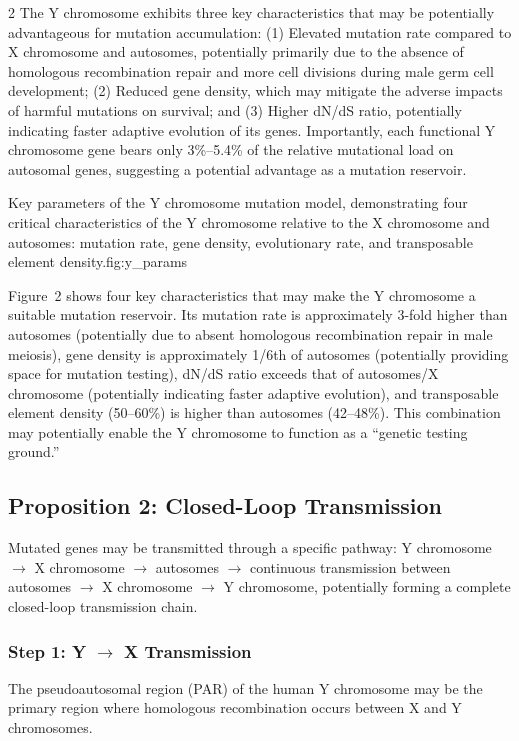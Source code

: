 \documentclass{base}
\begin{document}
\begin{multicols}{2}
The Y chromosome exhibits three key characteristics that may be potentially advantageous for mutation accumulation: (1) Elevated mutation rate compared to X chromosome and autosomes, potentially primarily due to the absence of homologous recombination repair and more cell divisions during male germ cell development; (2) Reduced gene density, which may mitigate the adverse impacts of harmful mutations on survival; and (3) Higher dN/dS ratio, potentially indicating faster adaptive evolution of its genes. Importantly, each functional Y chromosome gene bears only 3\%--5.4\% of the relative mutational load on autosomal genes, suggesting a potential advantage as a mutation reservoir.

{Key parameters of the Y chromosome mutation model, demonstrating four critical characteristics of the Y chromosome relative to the X chromosome and autosomes: mutation rate, gene density, evolutionary rate, and transposable element density.}{fig:y_params}

Figure~2 shows four key characteristics that may make the Y chromosome a suitable mutation reservoir. Its mutation rate is approximately 3-fold higher than autosomes (potentially due to absent homologous recombination repair in male meiosis), gene density is approximately 1/6th of autosomes (potentially providing space for mutation testing), dN/dS ratio exceeds that of autosomes/X chromosome (potentially indicating faster adaptive evolution), and transposable element density (50--60\%) is higher than autosomes (42--48\%). This combination may potentially enable the Y chromosome to function as a ``genetic testing ground.''


\subsection{Proposition 2: Closed-Loop Transmission}
Mutated genes may be transmitted through a specific pathway: Y chromosome $\rightarrow$ X chromosome $\rightarrow$ autosomes $\rightarrow$ continuous transmission between autosomes $\rightarrow$ X chromosome $\rightarrow$ Y chromosome, potentially forming a complete closed-loop transmission chain.


\subsubsection{Step 1: Y $\rightarrow$ X Transmission}
The pseudoautosomal region (PAR) of the human Y chromosome may be the primary region where homologous recombination occurs between X and Y chromosomes. 


\end{multicols}
\end{document}

